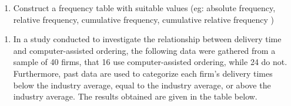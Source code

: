 \documentclass[]{book}
\providecommand{\tightlist}{%
  \setlength{\itemsep}{0pt}\setlength{\parskip}{0pt}}
\begin{document}
\begin{enumerate}
\def\labelenumi{\alph{enumi}.}
\tightlist
\item
  Construct a frequency table with suitable values (eg: absolute frequency, relative frequency, cumulative frequency, cumulative relative frequency )
\end{enumerate}

\begin{enumerate}
\def\labelenumi{\arabic{enumi}.}
\setcounter{enumi}{4}
\tightlist
\item
  In a study conducted to investigate the relationship between delivery time and computer-assisted ordering, the following data were gathered from a sample of 40 firms, that 16 use computer-assisted ordering, while 24 do not. Furthermore, past data are used to categorize each firm's delivery times below the industry average, equal to the industry average, or above the industry average. The results obtained are given in the table below.
\end{enumerate}
\end{document}

